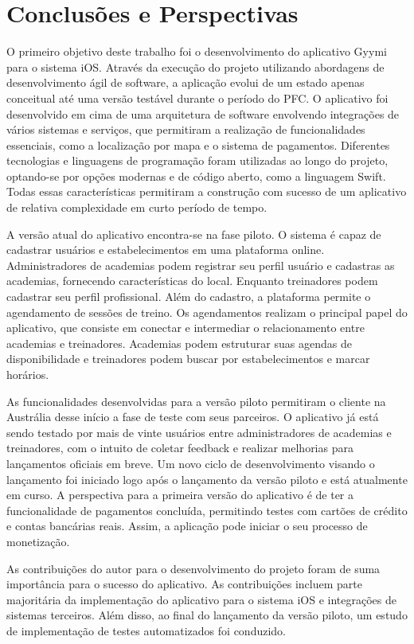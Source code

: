 \chapter{Conclusões e Perspectivas} \label{cap:conclusions}
O primeiro objetivo deste trabalho foi o desenvolvimento do aplicativo Gyymi para o sistema iOS. Através da execução do projeto utilizando abordagens de desenvolvimento ágil de software, a aplicação evolui de um estado apenas conceitual até uma versão testável durante o período do PFC. O aplicativo foi desenvolvido em cima de uma arquitetura de software envolvendo integrações de vários sistemas e serviços, que permitiram a realização de funcionalidades essenciais, como a localização por mapa e o sistema de pagamentos. Diferentes tecnologias e linguagens de programação foram utilizadas ao longo do projeto, optando-se por opções modernas e de código aberto, como a linguagem Swift. Todas essas características permitiram a construção com sucesso de um aplicativo de relativa complexidade em curto período de tempo.

A versão atual do aplicativo encontra-se na fase piloto. O sistema é capaz de cadastrar usuários e estabelecimentos em uma plataforma online. Administradores de academias podem registrar seu perfil usuário e cadastras as academias, fornecendo características do local. Enquanto treinadores podem cadastrar seu perfil profissional. Além do cadastro, a plataforma permite o agendamento de sessões de treino. Os agendamentos realizam o principal papel do aplicativo, que consiste em conectar e intermediar o relacionamento entre academias e treinadores. Academias podem estruturar suas agendas de disponibilidade e treinadores podem buscar por estabelecimentos e marcar horários.

As funcionalidades desenvolvidas para a versão piloto permitiram o cliente na Austrália desse início a fase de teste com seus parceiros. O aplicativo já está sendo testado por mais de vinte usuários entre administradores de academias e treinadores, com o intuito de coletar feedback e realizar melhorias para lançamentos oficiais em breve. Um novo ciclo de desenvolvimento visando o lançamento foi iniciado logo após o lançamento da versão piloto e está atualmente em curso. A perspectiva para a primeira versão do aplicativo é de ter a funcionalidade de pagamentos concluída, permitindo testes com cartões de crédito e contas bancárias reais. Assim, a aplicação pode iniciar o seu processo de monetização.

As contribuições do autor para o desenvolvimento do projeto foram de suma importância para o sucesso do aplicativo. As contribuições incluem parte majoritária da implementação do aplicativo para o sistema iOS e integrações de sistemas terceiros. Além disso, ao final do lançamento da versão piloto, um estudo de implementação de testes automatizados foi conduzido.

